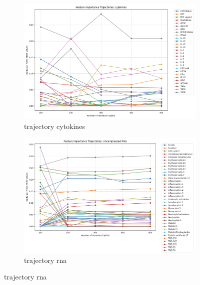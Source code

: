 \documentclass[12pt,a4paper]{report}
\begin{document}
\begin{figure}[h!]
    \centering
    \begin{subfigure}[b]{0.48\textwidth}
        \centering
        \includegraphics[width=\textwidth]{images/trajectory_cytokienes.png}
        \caption{trajectory cytokines}
        \label{fig:trajectory_cytokienes}
    \end{subfigure}
    \hfill
    \begin{subfigure}[b]{0.48\textwidth}
        \centering
        \includegraphics[width=\textwidth]{images/trajectory_RNA.png}
        \caption{trajectory \acrshort{rna}}
        \label{fig:trajectory_RNA}
    \end{subfigure}
    

\end{figure}
\end{document}
